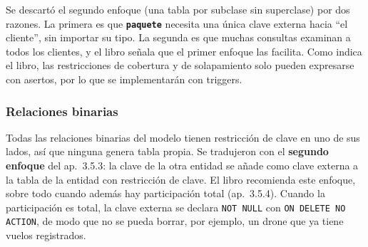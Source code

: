 \documentclass[11pt,a4paper]{article}
\newcommand{\tb}[1]{\textbf{\texttt{#1}}}
\begin{document}
Se descartó el segundo enfoque (una tabla por subclase sin superclase) por dos razones. La primera es que \tb{paquete} necesita una única clave externa hacia ``el cliente'', sin importar su tipo. La segunda es que muchas consultas examinan a todos los clientes, y el libro señala que el primer enfoque las facilita. Como indica el libro, las restricciones de cobertura y de solapamiento solo pueden expresarse con asertos, por lo que se implementarán con triggers.

\subsubsection{Relaciones binarias}
Todas las relaciones binarias del modelo tienen restricción de clave en uno de sus lados, así que ninguna genera tabla propia. Se tradujeron con el \textbf{segundo enfoque} del ap.~3.5.3: la clave de la otra entidad se añade como clave externa a la tabla de la entidad con restricción de clave. El libro recomienda este enfoque, sobre todo cuando además hay participación total (ap.~3.5.4). Cuando la participación es total, la clave externa se declara \texttt{NOT NULL} con \texttt{ON DELETE NO ACTION}, de modo que no se pueda borrar, por ejemplo, un drone que ya tiene vuelos registrados.
\end{document}
